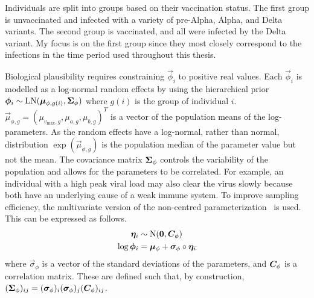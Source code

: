 \documentclass[thesis.tex]{subfiles}
\begin{document}
Individuals are split into groups based on their vaccination status.
The first group is unvaccinated and infected with a variety of pre-Alpha, Alpha, and Delta variants.
The second group is vaccinated, and all were infected by the Delta variant.
My focus is on the first group since they most closely correspond to the infections in the time period used throughout this thesis.

Biological plausibility requires constraining $\vec{\phi}_i$ to positive real values.
Each $\vec{\phi}_i$ is modelled as a log-normal random effects by using the hierarchical prior $\bm{\phi}_i \sim \operatorname{LN}(\bm{\mu}_{\phi,g(i)}, \bm{\Sigma}_\phi)$ where $g(i)$ is the group of individual $i$.
$\vec{\mu}_{\phi,g} = (\mu_{v_{\max},g}, \mu_{a,g}, \mu_{b,g})^T$ is a vector of the population means of the log-parameters.
As the random effects have a log-normal, rather than normal, distribution $\exp(\vec{\mu}_{\phi,g})$ is the population median of the parameter value but not the mean.
The covariance matrix $\bm{\Sigma}_\phi$ controls the variability of the population and allows for the parameters to be correlated.
For example, an individual with a high peak viral load may also clear the virus slowly because both have an underlying cause of a weak immune system.
To improve sampling efficiency, the multivariate version of the non-centred parameterization~\autocite{papaspiliopoulosGeneral,stanReparameterization} is used.
This can be expressed as follows.
\begin{align}
  \bm{\eta}_i &\sim \operatorname{N}(\bm{0}, \bm{C}_\phi) \\
  \log \bm{\phi}_i &= \bm{\mu}_\phi + \bm{\sigma}_\phi \circ \bm{\eta}_i
\end{align}
where $\vec{\sigma}_\phi$ is a vector of the standard deviations of the parameters, and $\bm{C}_\phi$ is a correlation matrix.
These are defined such that, by construction, $(\bm{\Sigma}_\phi)_{ij} = (\bm{\sigma}_\phi)_i (\bm{\sigma}_\phi)_j (\bm{C}_\phi)_{ij}$.
\end{document}
